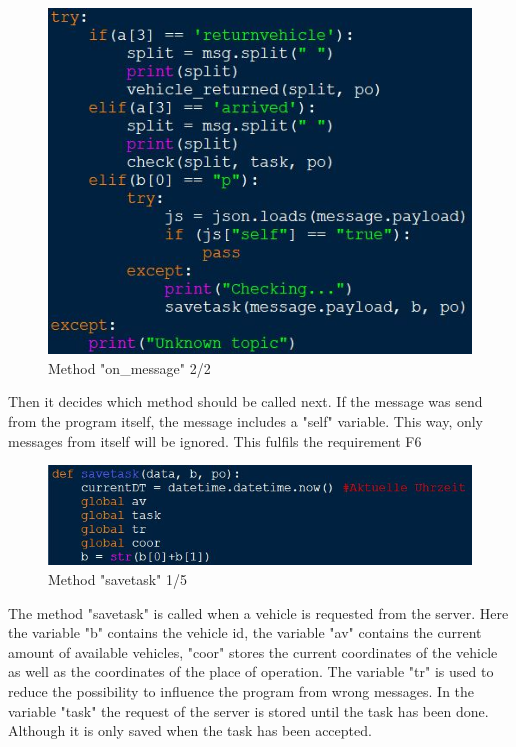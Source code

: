 \begin{figure}[!h]
\center
\includegraphics[scale=0.6]{images/Heiber/a7.JPG}
\caption[caption]{Method "on\_message" 2/2}
\end{figure}
\newline
Then it decides which method should be called next. If the message was send from the program itself, the message includes a "self" variable. This way, only messages from itself will be ignored. This fulfils the requirement F6
\begin{figure}[!h]
\center
\includegraphics[scale=0.6]{images/Heiber/a8.JPG}
\caption[caption]{Method "savetask" 1/5}
\end{figure}
\newline
The method "savetask" is called when a vehicle is requested from the server. Here the variable "b" contains the vehicle id, the variable "av" contains the current amount of available vehicles, "coor" stores the current coordinates of the vehicle as well as the coordinates of the place of operation. The variable "tr" is used to reduce the possibility to influence the program from wrong messages. In the variable "task" the request of the server is stored until the task has been done. Although it is only saved when the task has been accepted.
